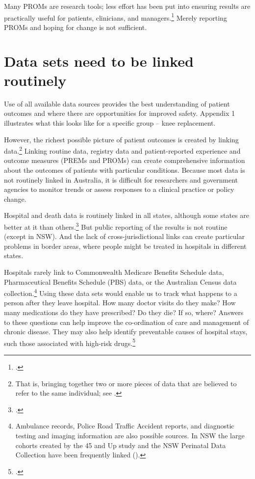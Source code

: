 \documentclass[FrontPage]{grattan}
\begin{document}
Many PROMs are research tools; less effort has been put into ensuring results are practically useful for patients, clinicians, and managers.\footcite{RN64}
Merely reporting PROMs and hoping for change is not sufficient.








\chapter{Data sets need to be linked routinely}\label{chap:link}
Use of all available data sources provides the best understanding of patient outcomes and where there are opportunities for improved safety. Appendix 1 illustrates what this looks like for a specific group -- knee replacement.

However, the richest possible picture of patient outcomes is created by linking data.\footnote{That is, bringing together two or more pieces of data that are believed to refer to the same individual; see \textcite{RN77}.}
Linking routine data, registry data and patient-reported experience and outcome measures (PREMs and PROMs) can create comprehensive information about the outcomes of patients with particular conditions. Because most data is not routinely linked in Australia, it is difficult for researchers and government agencies to monitor trends or assess responses to a clinical practice or policy change.

Hospital and death data is routinely linked in all states, although some states are better at it than others.\footcite{RN78}
But public reporting of the results is not routine (except in NSW). And the lack of cross-jurisdictional links can create particular problems in border areas, where people might be treated in hospitals in different states.

Hospitals rarely link to Commonwealth Medicare Benefits Schedule data, Pharmaceutical Benefits Schedule (PBS) data, or the Australian Census data collection.\footnote{Ambulance records, Police Road Traffic Accident reports, and diagnostic testing and imaging information are also possible sources. In NSW the large cohorts created by the 45 and Up study and the NSW Perinatal Data Collection have been frequently linked (\textcite{RN78}).}
Using these data sets would enable us to track what happens to a person after they leave hospital. How many doctor visits do they make? How many medications do they have prescribed? Do they die? If so, where? Answers to these questions can help improve the co-ordination of care and management of chronic disease. They may also help identify preventable causes of hospital stays, such those associated with high-risk drugs.\footcite{RN79}
\end{document}
